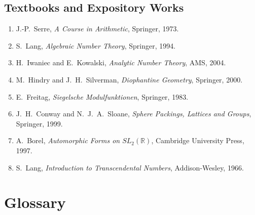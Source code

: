 \subsection*{Textbooks and Expository Works}
\begin{enumerate}
    \item J.-P.\ Serre, \textit{A Course in Arithmetic}, Springer, 1973.
    \item S.\ Lang, \textit{Algebraic Number Theory}, Springer, 1994.
    \item H.\ Iwaniec and E.\ Kowalski, \textit{Analytic Number Theory}, AMS, 2004.
    \item M.\ Hindry and J.\ H.\ Silverman, \textit{Diophantine Geometry}, Springer, 2000.
    \item E.\ Freitag, \textit{Siegelsche Modulfunktionen}, Springer, 1983.
    \item J.\ H.\ Conway and N.\ J.\ A.\ Sloane, \textit{Sphere Packings, Lattices and Groups}, Springer, 1999.
    \item A.\ Borel, \textit{Automorphic Forms on $SL_2(\mathbb{R})$}, Cambridge University Press, 1997.
    \item S.\ Lang, \textit{Introduction to Transcendental Numbers}, Addison-Wesley, 1966.
\end{enumerate}

\section*{Glossary}

